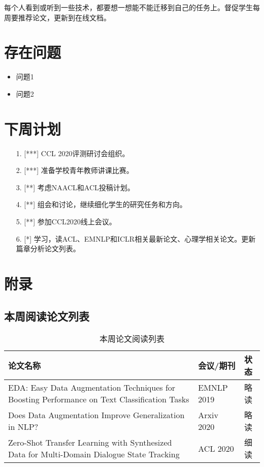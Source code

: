 \documentclass[11pt]{article}
\begin{document}
\begin{CJK}{UTF8}{gkai}
每个人看到或听到一些技术，都要想一想能不能迁移到自己的任务上。督促学生每周要推荐论文，更新到在线文档。

\section{存在问题}

\begin{itemize}
\item 问题1
\item 问题2
\end{itemize}

\section{下周计划}
\begin{itemize}
\item [1.] [***] CCL 2020评测研讨会组织。
\item [2.] [***] 准备学校青年教师讲课比赛。
\item [3.] [**]  考虑NAACL和ACL投稿计划。
\item [4.] [**] 组会和讨论，继续细化学生的研究任务和方向。
\item [5.] [**] 参加CCL2020线上会议。
\item [6.] [*] 学习，读ACL、EMNLP和ICLR相关最新论文、心理学相关论文。更新篇章分析论文列表。
\end{itemize}

\appendix

\section{附录}\label{sec:appendix}

\subsection{本周阅读论文列表}
\begin{table*}[h]\small
\centering
		\begin{tabular}{lll}
		\toprule 
		\textbf{论文名称} & 会议/期刊 & 状态\\ \hline
		EDA: Easy Data Augmentation Techniques for Boosting Performance on Text Classification Tasks & EMNLP 2019 & 略读 \\
		Does Data Augmentation Improve Generalization in NLP? & Arxiv 2020 & 略读 \\
		Zero-Shot Transfer Learning with Synthesized Data for Multi-Domain Dialogue State Tracking & ACL 2020 & 细读 \\
      \bottomrule
		\end{tabular}
	\caption{本周论文阅读列表}
\end{table*}


\end{CJK}
\end{document}
